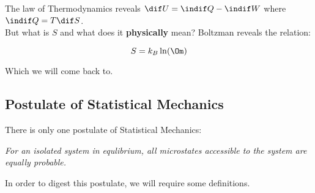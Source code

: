 \documentclass{article}
\begin{document}
The  law of Thermodynamics reveals $\dif U = \indif Q - \indif W$ where $\indif Q = T \dif S$. \\

But what is $S$ and what does it \textbf{physically} mean? Boltzman reveals the relation:

\[ S = k_B \ln (\Om) \]

Which we will come back to.

\subsection{Postulate of Statistical Mechanics}

There is only one postulate of Statistical Mechanics:
\begin{displayquote}
    \textit{For an isolated system in equlibrium, all microstates accessible to the system are equally probable.}
\end{displayquote}

In order to digest this postulate, we will require some definitions.

\end{document}
